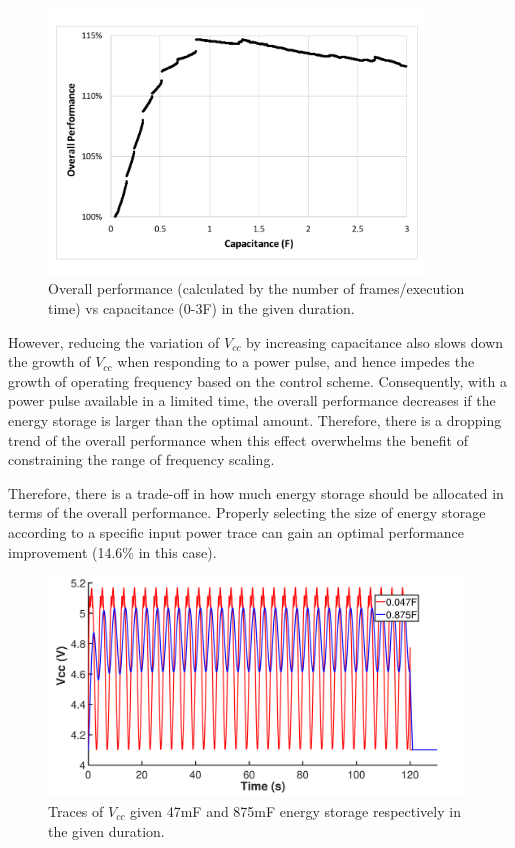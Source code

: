 \begin{figure} [!tb]
    \centering
    \includegraphics[width=10cm]{figure/work2/frames}
    \caption{Overall performance (calculated by the number of frames/execution time) vs capacitance (0-3F) in the given duration.}
    \label{Figure:frames}
\end{figure} 

However, reducing the variation of $V_{cc}$ by increasing capacitance also slows down the growth of $V_{cc}$ when responding to a power pulse, and hence impedes the growth of operating frequency based on the control scheme. Consequently, with a power pulse available in a limited time, the overall performance decreases if the energy storage is larger than the optimal amount. Therefore, there is a dropping trend of the overall performance when this effect overwhelms the benefit of constraining the range of frequency scaling.

Therefore, there is a trade-off in how much energy storage should be allocated in terms of the overall performance. Properly selecting the size of energy storage according to a specific input power trace can gain an optimal performance improvement (14.6\% in this case).

\begin{figure} [!tb]
    \centering
    \includegraphics[width=11cm]{figure/work2/vcc}
    \caption{Traces of $V_{cc}$ given 47mF and 875mF energy storage respectively in the given duration.}
    \label{Figure:vcc}
\end{figure} 


